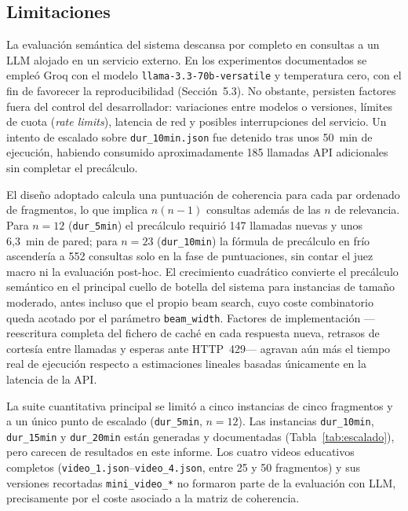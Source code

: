 \documentclass[12pt,a4paper]{article}
\begin{document}
\subsection{Limitaciones}

La evaluación semántica del sistema descansa por completo en consultas a un LLM alojado en un servicio externo. En los experimentos documentados se empleó Groq con el modelo \texttt{llama-3.3-70b-versatile} y temperatura cero, con el fin de favorecer la reproducibilidad (Sección~5.3). No obstante, persisten factores fuera del control del desarrollador: variaciones entre modelos o versiones, límites de cuota (\textit{rate limits}), latencia de red y posibles interrupciones del servicio. Un intento de escalado sobre \texttt{dur\_10min.json} fue detenido tras unos 50~min de ejecución, habiendo consumido aproximadamente 185 llamadas API adicionales sin completar el precálculo.

El diseño adoptado calcula una puntuación de coherencia para cada par ordenado de fragmentos, lo que implica \(n(n-1)\) consultas además de las \(n\) de relevancia. Para \(n=12\) (\texttt{dur\_5min}) el precálculo requirió 147 llamadas nuevas y unos 6{,}3~min de pared; para \(n=23\) (\texttt{dur\_10min}) la fórmula de precálculo en frío ascendería a 552 consultas solo en la fase de puntuaciones, sin contar el juez macro ni la evaluación post-hoc. El crecimiento cuadrático convierte el precálculo semántico en el principal cuello de botella del sistema para instancias de tamaño moderado, antes incluso que el propio beam search, cuyo coste combinatorio queda acotado por el parámetro \texttt{beam\_width}. Factores de implementación ---reescritura completa del fichero de caché en cada respuesta nueva, retrasos de cortesía entre llamadas y esperas ante HTTP~429--- agravan aún más el tiempo real de ejecución respecto a estimaciones lineales basadas únicamente en la latencia de la API.

La suite cuantitativa principal se limitó a cinco instancias de cinco fragmentos y a un único punto de escalado (\texttt{dur\_5min}, \(n=12\)). Las instancias \texttt{dur\_10min}, \texttt{dur\_15min} y \texttt{dur\_20min} están generadas y documentadas (Tabla~\ref{tab:escalado}), pero carecen de resultados en este informe. Los cuatro videos educativos completos (\texttt{video\_1.json}--\texttt{video\_4.json}, entre 25 y 50 fragmentos) y sus versiones recortadas \texttt{mini\_video\_*} no formaron parte de la evaluación con LLM, precisamente por el coste asociado a la matriz de coherencia.
\end{document}

